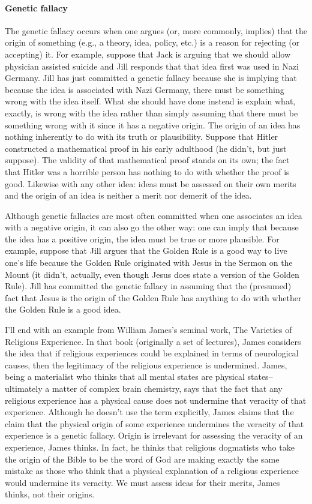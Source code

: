 \paragraph{Genetic fallacy}
The genetic fallacy occurs when one argues (or, more commonly, implies) that
the origin of something (e.g., a theory, idea, policy, etc.) is a reason for rejecting
(or accepting) it. For example, suppose that Jack is arguing that we should
allow physician assisted suicide and Jill responds that that idea first was used in
Nazi Germany. Jill has just committed a genetic fallacy because she is implying
that because the idea is associated with Nazi Germany, there must be
something wrong with the idea itself. What she should have done instead is
explain what, exactly, is wrong with the idea rather than simply assuming that
there must be something wrong with it since it has a negative origin. The origin
of an idea has nothing inherently to do with its truth or plausibility. Suppose
that Hitler constructed a mathematical proof in his early adulthood (he didn't,
but just suppose). The validity of that mathematical proof stands on its own; the
fact that Hitler was a horrible person has nothing to do with whether the proof is
good. Likewise with any other idea: ideas must be assessed on their own merits
and the origin of an idea is neither a merit nor demerit of the idea.

Although genetic fallacies are most often committed when one associates an
idea with a negative origin, it can also go the other way: one can imply that
because the idea has a positive origin, the idea must be true or more plausible.
For example, suppose that Jill argues that the Golden Rule is a good way to live
one's life because the Golden Rule originated with Jesus in the Sermon on the
Mount (it didn't, actually, even though Jesus does state a version of the Golden
Rule). Jill has committed the genetic fallacy in assuming that the (presumed)
fact that Jesus is the origin of the Golden Rule has anything to do with whether
the Golden Rule is a good idea.

I'll end with an example from William James's seminal work, The Varieties of
Religious Experience. In that book (originally a set of lectures), James considers
the idea that if religious experiences could be explained in terms of neurological
causes, then the legitimacy of the religious experience is undermined. James,
being a materialist who thinks that all mental states are physical states--
ultimately a matter of complex brain chemistry, says that the fact that any
religious experience has a physical cause does not undermine that veracity of
that experience. Although he doesn't use the term explicitly, James claims that
the claim that the physical origin of some experience undermines the veracity of
that experience is a genetic fallacy. Origin is irrelevant for assessing the veracity
of an experience, James thinks. In fact, he thinks that religious dogmatists who
take the origin of the Bible to be the word of God are making exactly the same
mistake as those who think that a physical explanation of a religious experience
would undermine its veracity. We must assess ideas for their merits, James
thinks, not their origins.

